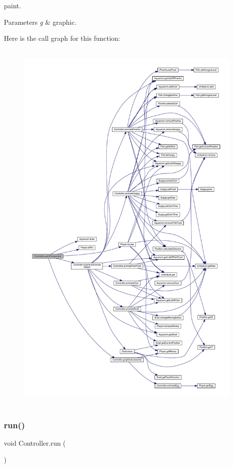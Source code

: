 paint. 
\begin{DoxyParams}{Parameters}
{\em g} & graphic. \\
\hline
\end{DoxyParams}
Here is the call graph for this function\+:
\nopagebreak
\begin{figure}[H]
\begin{center}
\leavevmode
\includegraphics[height=550pt]{class_controller_a3d48c05f5876d46347a4b22f3d6d5a1a_cgraph}
\end{center}
\end{figure}
\mbox{\label{class_controller_a2fcfd8c4d229d4deeec470de95567805}} 
\subsubsection{\texorpdfstring{run()}{run()}}
{\footnotesize\ttfamily void Controller.\+run (\begin{DoxyParamCaption}{ }\end{DoxyParamCaption})\hspace{0.3cm}{\ttfamily [inline]}}

